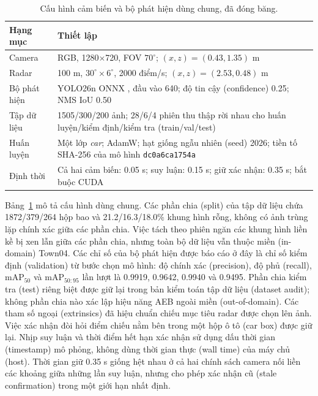 \documentclass[conference]{IEEEtran}
\begin{document}
\begin{table}[t]
\caption{Cấu hình cảm biến và bộ phát hiện dùng chung, đã đóng băng.}
\label{tab:setup}
\centering\scriptsize
\setlength{\tabcolsep}{3pt}
\begin{tabular}{p{}p{}}
\toprule Hạng mục & Thiết lập\\ \midrule
Camera & RGB, 1280$\times$720, FOV $70^\circ$; $(x,z)=(0.43,1.35)$ m\\
Radar & 100 m, $30^\circ\!\times6^\circ$, 2000 điểm/s; $(x,z)=(2.53,0.48)$ m\\
Bộ phát hiện & YOLO26n ONNX \cite{ultralytics_yolo}, đầu vào 640; độ tin cậy (confidence) 0.25; NMS IoU 0.50\\
Tập dữ liệu & 1505/300/200 ảnh; 28/6/4 phiên thu thập rời nhau cho huấn luyện/kiểm định/kiểm tra (train/val/test)\\
Huấn luyện & Một lớp \emph{car}; AdamW; hạt giống ngẫu nhiên (seed) 2026; tiền tố SHA-256 của mô hình \texttt{dc0a6ca1754a}\\
Định thời & Cả hai cảm biến: 0.05 s; suy luận: 0.15 s; giữ xác nhận: 0.35 s; bắt buộc CUDA\\
\bottomrule
\end{tabular}
\end{table}

Bảng~\ref{tab:setup} mô tả cấu hình dùng chung. Các phần chia (split) của tập
dữ liệu chứa 1872/379/264 hộp bao và 21.2/16.3/18.0\% khung hình rỗng, không
có ảnh trùng lặp chính xác giữa các phần chia. Việc tách theo phiên ngăn các
khung hình liền kề bị xen lẫn giữa các phần chia, nhưng toàn bộ dữ liệu vẫn
thuộc miền (in-domain) Town04. Các chỉ số của bộ phát hiện được báo cáo ở đây
là chỉ số kiểm định (validation) từ bước chọn mô hình: độ chính xác (precision),
độ phủ (recall), $\mathrm{mAP}_{50}$ và $\mathrm{mAP}_{50:95}$ lần lượt là 0.9919, 0.9642,
0.9940 và 0.9495. Phần chia kiểm tra (test) riêng biệt được giữ lại trong bản
kiểm toán tập dữ liệu (dataset audit); không phần chia nào xác lập hiệu năng
AEB ngoài miền (out-of-domain). Các tham số ngoại (extrinsics) đã hiệu chuẩn
chiếu mục tiêu radar được chọn lên ảnh. Việc xác nhận đòi hỏi điểm chiếu nằm
bên trong một hộp ô tô (car box) được giữ lại. Nhịp suy luận và thời điểm hết
hạn xác nhận sử dụng dấu thời gian (timestamp) mô phỏng, không dùng thời gian
thực (wall time) của máy chủ (host). Thời gian giữ 0.35 s giống hệt nhau ở cả
hai chính sách camera nối liền các khoảng giữa những lần suy luận, nhưng cho
phép xác nhận cũ (stale confirmation) trong một giới hạn nhất định.
\end{document}
